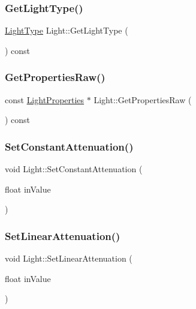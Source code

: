 \subsubsection{\texorpdfstring{Get\+Light\+Type()}{GetLightType()}}
{\footnotesize\ttfamily \hyperlink{class_light_a661d9480e01af8b1612860b9630ef5f8}{Light\+Type} Light\+::\+Get\+Light\+Type (\begin{DoxyParamCaption}{ }\end{DoxyParamCaption}) const\hspace{0.3cm}{\ttfamily [inline]}}

\hypertarget{class_light_a1d2283dacdef30df671d55b7dc415851}{}\label{class_light_a1d2283dacdef30df671d55b7dc415851} 
\subsubsection{\texorpdfstring{Get\+Properties\+Raw()}{GetPropertiesRaw()}}
{\footnotesize\ttfamily const \hyperlink{struct_light_properties}{Light\+Properties} $\ast$ Light\+::\+Get\+Properties\+Raw (\begin{DoxyParamCaption}{ }\end{DoxyParamCaption}) const}

\hypertarget{class_light_aec7f3864e328bc9fada51fdb3e8a7c8e}{}\label{class_light_aec7f3864e328bc9fada51fdb3e8a7c8e} 
\subsubsection{\texorpdfstring{Set\+Constant\+Attenuation()}{SetConstantAttenuation()}}
{\footnotesize\ttfamily void Light\+::\+Set\+Constant\+Attenuation (\begin{DoxyParamCaption}\item[{float}]{in\+Value }\end{DoxyParamCaption})}

\hypertarget{class_light_aa33086ed4bff3ac95c700698b3070108}{}\label{class_light_aa33086ed4bff3ac95c700698b3070108} 
\subsubsection{\texorpdfstring{Set\+Linear\+Attenuation()}{SetLinearAttenuation()}}
{\footnotesize\ttfamily void Light\+::\+Set\+Linear\+Attenuation (\begin{DoxyParamCaption}\item[{float}]{in\+Value }\end{DoxyParamCaption})}

